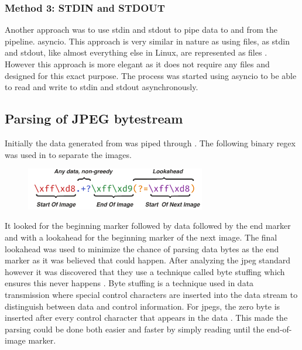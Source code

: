 \subsubsection{Method 3: STDIN and STDOUT}
Another approach was to use \gls{stdin} and \gls{stdout} to pipe data to and from the pipeline.
\gls{asyncio}.
This approach is very similar in nature as using files, as \gls{stdin} and \gls{stdout}, like almost everything else in Linux, are represented as files \cite{mckayWhatAreStdin2020}.
However this approach is more elegant as it does not require any files and designed for this exact purpose.
The \gs process was started using \gls{asyncio} to be able to read and write to \gls{stdin} and \gls{stdout} asynchronously.

\subsection{Parsing of JPEG bytestream}
Initially the data generated from \gs was piped through .
The following binary \gls{regex} was used in to separate the images.
\begin{figure}[H]
    \centering
    \includegraphics[width=0.7\textwidth]{figures/jpeg_regex.pdf}
\end{figure}
It looked for the beginning marker followed by data followed by the end marker and with a lookahead for the beginning marker of the next image.
The final lookahead was used to minimize the chance of parsing data bytes as the end marker as it was believed that could happen.
After analyzing the \gls{jpeg} standard however it was discovered that they use a technique called byte stuffing which ensures this never happens \cite[91]{ccittINFORMATIONTECHNOLOGYDIGITAL1992}.
Byte stuffing is a technique used in data transmission where special control characters are inserted into the data stream to distinguish between data and control information.
For \glspl{jpeg}, the zero byte is inserted after every control character that appears in the data \cite[91]{ccittINFORMATIONTECHNOLOGYDIGITAL1992}.
This made the parsing could be done both easier and faster by simply reading until the end-of-image marker.